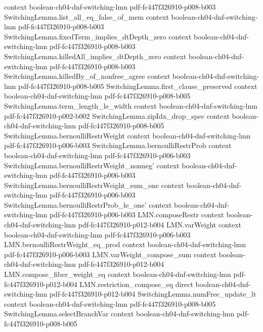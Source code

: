 \begin{theorem}
  {context}
  {boolean-ch04-dnf-switching-lmn}
  {pdf-fc447f326910-p008-b003}
\proofstep
  {SwitchingLemma.list_all_eq_false_of_mem}
  {context}
  {boolean-ch04-dnf-switching-lmn}
  {pdf-fc447f326910-p008-b003}
\proofstep
  {SwitchingLemma.fixedTerm_implies_dtDepth_zero}
  {context}
  {boolean-ch04-dnf-switching-lmn}
  {pdf-fc447f326910-p008-b003}
\proofstep
  {SwitchingLemma.killedAll_implies_dtDepth_zero}
  {context}
  {boolean-ch04-dnf-switching-lmn}
  {pdf-fc447f326910-p008-b003}
\proofstep
  {SwitchingLemma.killedBy_of_nonfree_agree}
  {context}
  {boolean-ch04-dnf-switching-lmn}
  {pdf-fc447f326910-p008-b005}
\proofstep
  {SwitchingLemma.first_clause_preserved}
  {context}
  {boolean-ch04-dnf-switching-lmn}
  {pdf-fc447f326910-p008-b005}
\proofstep
  {SwitchingLemma.term_length_le_width}
  {context}
  {boolean-ch04-dnf-switching-lmn}
  {pdf-fc447f326910-p002-b002}
\proofstep
  {SwitchingLemma.zipIdx_drop_spec}
  {context}
  {boolean-ch04-dnf-switching-lmn}
  {pdf-fc447f326910-p008-b005}
\proofstep
  {SwitchingLemma.bernoulliRestrWeight}
  {context}
  {boolean-ch04-dnf-switching-lmn}
  {pdf-fc447f326910-p006-b003}
\proofstep
  {SwitchingLemma.bernoulliRestrProb}
  {context}
  {boolean-ch04-dnf-switching-lmn}
  {pdf-fc447f326910-p006-b003}
\proofstep
  {SwitchingLemma.bernoulliRestrWeight_nonneg'}
  {context}
  {boolean-ch04-dnf-switching-lmn}
  {pdf-fc447f326910-p006-b003}
\proofstep
  {SwitchingLemma.bernoulliRestrWeight_sum_one}
  {context}
  {boolean-ch04-dnf-switching-lmn}
  {pdf-fc447f326910-p006-b003}
\proofstep
  {SwitchingLemma.bernoulliRestrProb_le_one'}
  {context}
  {boolean-ch04-dnf-switching-lmn}
  {pdf-fc447f326910-p006-b003}
\proofstep
  {LMN.composeRestr}
  {context}
  {boolean-ch04-dnf-switching-lmn}
  {pdf-fc447f326910-p012-b004}
\proofstep
  {LMN.varWeight}
  {context}
  {boolean-ch04-dnf-switching-lmn}
  {pdf-fc447f326910-p006-b003}
\proofstep
  {LMN.bernoulliRestrWeight_eq_prod}
  {context}
  {boolean-ch04-dnf-switching-lmn}
  {pdf-fc447f326910-p006-b003}
\proofstep
  {LMN.varWeight_compose_sum}
  {context}
  {boolean-ch04-dnf-switching-lmn}
  {pdf-fc447f326910-p012-b004}
\proofstep
  {LMN.compose_fiber_weight_eq}
  {context}
  {boolean-ch04-dnf-switching-lmn}
  {pdf-fc447f326910-p012-b004}
\proofstep
  {LMN.restriction_compose_eq}
  {direct}
  {boolean-ch04-dnf-switching-lmn}
  {pdf-fc447f326910-p012-b004}
\proofstep
  {SwitchingLemma.numFree_update_lt}
  {context}
  {boolean-ch04-dnf-switching-lmn}
  {pdf-fc447f326910-p008-b005}
\proofstep
  {SwitchingLemma.selectBranchVar}
  {context}
  {boolean-ch04-dnf-switching-lmn}
  {pdf-fc447f326910-p008-b005}

\end{theorem}
